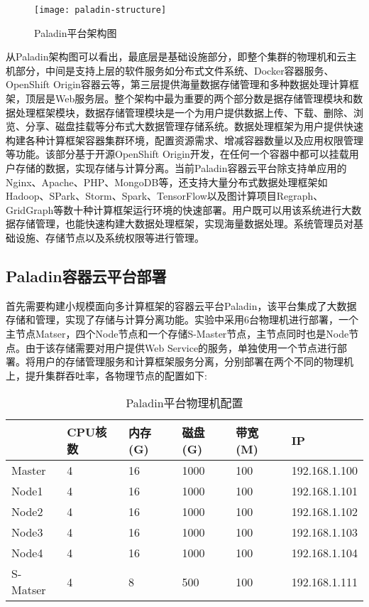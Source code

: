 \begin{figure}[H] %
	\centering
	\texttt{[image: paladin-structure]}
	\caption{Paladin平台架构图}
\end{figure}

从Paladin架构图可以看出，最底层是基础设施部分，即整个集群的物理机和云主机部分，中间是支持上层的软件服务如分布式文件系统、Docker容器服务、OpenShift Origin容器云等，第三层提供海量数据存储管理和多种数据处理计算框架，顶层是Web服务层。整个架构中最为重要的两个部分数是据存储管理模块和数据处理框架模块，数据存储管理模块是一个为用户提供数据上传、下载、删除、浏览、分享、磁盘挂载等分布式大数据管理存储系统。数据处理框架为用户提供快速构建各种计算框架容器集群环境，配置资源需求、增减容器数量以及应用权限管理等功能。该部分基于开源OpenShift Origin开发，在任何一个容器中都可以挂载用户存储的数据，实现存储与计算分离。当前Paladin容器云平台除支持单应用的Nginx、Apache、PHP、MongoDB等，还支持大量分布式数据处理框架如Hadoop、SPark、Storm、Spark、TensorFlow以及图计算项目Regraph、GridGraph等数十种计算框架运行环境的快速部署。用户既可以用该系统进行大数据存储管理，也能快速构建大数据处理框架，实现海量数据处理。系统管理员对基础设施、存储节点以及系统权限等进行管理。

\subsection{Paladin容器云平台部署}
首先需要构建小规模面向多计算框架的容器云平台Paladin，该平台集成了大数据存储和管理，实现了存储与计算分离功能。实验中采用6台物理机进行部署，一个主节点Matser，四个Node节点和一个存储S-Master节点，主节点同时也是Node节点。由于该存储需要对用户提供Web Service的服务，单独使用一个节点进行部署。将用户的存储管理服务和计算框架服务分离，分别部署在两个不同的物理机上，提升集群吞吐率，各物理节点的配置如下:
\begin{table}[H]
	\centering\dawu[1.3]
	\caption{Paladin平台物理机配置}
	\begin{tabular}{|p{1.8cm}<{\centering}|p{1.5cm}<{\centering}|p{1.5cm}<{\centering}|p{1.5cm}<{\centering}|p{1.5cm}<{\centering}|p{3cm}<{\centering}|} \hline
		\diagbox[innerwidth=1.8cm]{节点}{资源} & CPU核数 & 内存(G) & 磁盘(G) & 带宽(M) & IP \\ \hline
		Master & 4 & 16 & 1000 & 100 & 192.168.1.100  \\ \hline
		Node1 & 4 & 16 & 1000 & 100  & 192.168.1.101 \\ \hline
		Node2 & 4 & 16 & 1000 & 100  & 192.168.1.102 \\ \hline
		Node3 & 4 & 16 & 1000 & 100  & 192.168.1.103 \\ \hline
		Node4 & 4 & 16 & 1000 & 100  & 192.168.1.104 \\ \hline
		S-Matser & 4 & 8 & 500 & 100  & 192.168.1.111 \\ \hline
	\end{tabular}
\end{table}

